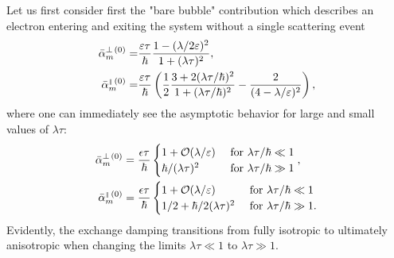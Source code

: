 Let us first consider first the "bare bubble" contribution which describes an electron entering and exiting the system without a single scattering event
\begin{align}
    \bar{\alpha}_{m}^{\perp\,(0)} =  & \frac{\varepsilon\tau}{\hbar} \frac{1-(\lambda/2\varepsilon)^2}{1+(\lambda\tau)^2},\\
    \bar{\alpha}_{m}^{{\scriptscriptstyle\parallel}\,(0)} =  & \frac{\varepsilon\tau}{\hbar}\left(\frac{1}{2}\frac{3+2(\lambda\tau/\hbar)^2}{1+(\lambda\tau/\hbar)^2}-\frac{2}{(4-\lambda/\varepsilon)^2}\right),
\end{align}
where one can immediately see the asymptotic behavior for large and small values of $\lambda\tau$:
\begin{align}
    \bar{\alpha}_{m}^{\perp\,(0)}  & = \frac{\epsilon\tau}{\hbar}\begin{cases}
    1  +\mathcal{O}(\lambda/\varepsilon)  & \text{ for }\lambda\tau/\hbar\ll1\\
    \hbar/(\lambda\tau)^2 & \text{ for }\lambda\tau/\hbar\gg1
    \end{cases},\\
    \bar{\alpha}_{m}^{{\scriptscriptstyle\parallel}\,(0)}  & = \frac{\epsilon\tau}{\hbar}\begin{cases}
    1  +\mathcal{O}(\lambda/\varepsilon)  & \text{ for }\lambda\tau/\hbar\ll1\\
    1/2 + \hbar/2(\lambda\tau)^2 & \text{ for }\lambda\tau/\hbar\gg1.
    \end{cases}
\end{align}
Evidently, the exchange damping transitions from fully isotropic to ultimately anisotropic when changing the limits $\lambda\tau\ll1$ to $\lambda\tau\gg1$. 

